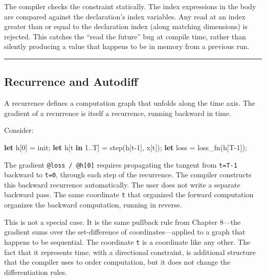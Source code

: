\documentclass[11pt,]{article}
\newenvironment{Shaded}{}{}
\newcommand{\DecValTok}[1]{\textcolor[rgb]{0.25,0.63,0.44}{#1}}
\newcommand{\KeywordTok}[1]{\textcolor[rgb]{0.00,0.44,0.13}{\textbf{#1}}}
\newcommand{\NormalTok}[1]{#1}
\newcommand{\OperatorTok}[1]{\textcolor[rgb]{0.40,0.40,0.40}{#1}}
\begin{document}
The compiler checks the constraint statically. The index expressions in
the body are compared against the declaration's index variables. Any
read at an index greater than or equal to the declaration index (along
matching dimensions) is rejected. This catches the ``read the future''
bug at compile time, rather than silently producing a value that happens
to be in memory from a previous run.

\begin{center}\rule{0.5\linewidth}{0.4pt}\end{center}

\hypertarget{recurrence-and-autodiff}{%
\subsection{Recurrence and Autodiff}\label{recurrence-and-autodiff}}

A recurrence defines a computation graph that unfolds along the time
axis. The gradient of a recurrence is itself a recurrence, running
backward in time.

Consider:

\begin{Shaded}
\begin{Highlighting}[]
\KeywordTok{let}\NormalTok{ h}\OperatorTok{[}\DecValTok{0}\OperatorTok{]}\NormalTok{ = init;}
\KeywordTok{let}\NormalTok{ h}\OperatorTok{[}\NormalTok{t }\KeywordTok{in} \DecValTok{1.}\NormalTok{.T}\OperatorTok{]}\NormalTok{ = step(h}\OperatorTok{[}\NormalTok{t-}\DecValTok{1}\OperatorTok{]}\NormalTok{, x}\OperatorTok{[}\NormalTok{t}\OperatorTok{]}\NormalTok{);}
\KeywordTok{let}\NormalTok{ loss = loss_fn(h}\OperatorTok{[}\NormalTok{T-}\DecValTok{1}\OperatorTok{]}\NormalTok{);}
\end{Highlighting}
\end{Shaded}

The gradient \texttt{@loss\ /\ @h{[}0{]}} requires propagating the
tangent from \texttt{t=T-1} backward to \texttt{t=0}, through each step
of the recurrence. The compiler constructs this backward recurrence
automatically. The user does not write a separate backward pass. The
same coordinate \texttt{t} that organized the forward computation
organizes the backward computation, running in reverse.

This is not a special case. It is the same pullback rule from Chapter
8---the gradient sums over the set-difference of coordinates---applied
to a graph that happens to be sequential. The coordinate \texttt{t} is a
coordinate like any other. The fact that it represents time, with a
directional constraint, is additional structure that the compiler uses
to order computation, but it does not change the differentiation rules.
\end{document}
